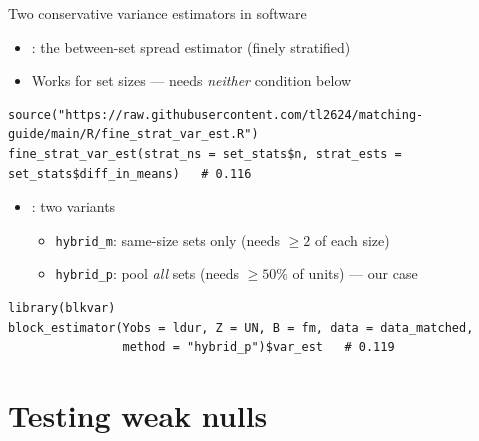 \documentclass[table, xcolor = {dvipsnames}, 9pt]{beamer}
\theoremstyle{plain}
\newcommand{\mh}[1]{{\color{magenta}{#1}}}
\begin{document}
\begin{frame}[fragile]{Two conservative variance estimators in software}
\vfill
\begin{itemize} \vfill
\item \citet{fogarty2018}: the between-set spread estimator (finely stratified) \vfill
\item[] Works for \mh{any} set sizes --- needs \emph{neither} condition below \vfill
\end{itemize}
\begin{lstlisting}[style=Rstyle, basicstyle=\ttfamily\tiny, frame=single]
source("https://raw.githubusercontent.com/tl2624/matching-guide/main/R/fine_strat_var_est.R")
fine_strat_var_est(strat_ns = set_stats$n, strat_ests = set_stats$diff_in_means)   # 0.116
\end{lstlisting}
\begin{itemize} \vfill
\item \citet{pashleymiratrix2021}: two variants \vfill
\begin{itemize} \vfill
\item \texttt{hybrid\_m}: same-size sets only (needs $\ge 2$ of each size) \vfill
\item \texttt{hybrid\_p}: pool \emph{all} sets (needs \mh{no set} $\ge 50\%$ of units) --- our case \vfill
\end{itemize}
\end{itemize}
\begin{lstlisting}[style=Rstyle, basicstyle=\ttfamily\tiny, frame=single]
library(blkvar)
block_estimator(Yobs = ldur, Z = UN, B = fm, data = data_matched,
                method = "hybrid_p")$var_est   # 0.119
\end{lstlisting}
\end{frame}
\section{Testing weak nulls}
\end{document}
